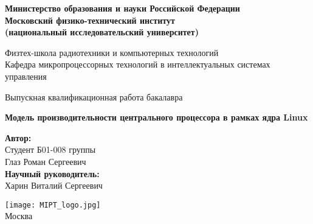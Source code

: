 \begin{center}

    \large\textbf{Министерство образования и науки Российской Федерации         \\
    Московский физико-технический институт                                      \\
    (национальный исследовательский университет)}                               \\
    \vspace{1cm}

    Физтех-школа радиотехники и компьютерных технологий                         \\

    Кафедра микропроцессорных технологий в интеллектуальных системах управления \\

    \vspace{3em}

    Выпускная квалификационная работа бакалавра
\end{center}

\begin{center}
    \vspace{\fill}
    \textbf{\LARGE{Модель производительности центрального процессора в рамках ядра Linux}}
    \vspace{\fill}
\end{center}

\begin{flushright}
    \textbf{Автор:}                \\
    Студент Б01-008 группы         \\
    Глаз Роман Сергеевич           \\
    \vspace{2em}
    \textbf{Научный руководитель:} \\
    Харин Виталий Сергеевич        \\
\end{flushright}

\vspace{7em}

\begin{center}
    \texttt{[image: MIPT\_logo.jpg]}\\
    Москва \the\year{}
\end{center}

\thispagestyle{empty}
\newpage
\setcounter{page}{2}
\fancyfoot[c]{\thepage}

\fancyhead[L]{}
\fancyhead[R]{}
\fancyhead[C]{}
\renewcommand{\headrulewidth}{0pt}
